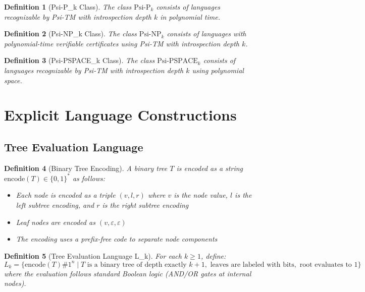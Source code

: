 \documentclass[11pt]{article}
\newtheorem{definition}{Definition}
\begin{document}
\begin{definition}[Psi-P_k Class]
The class $\text{Psi-P}_k$ consists of languages recognizable by Psi-TM with introspection depth $k$ in polynomial time.
\end{definition}

\begin{definition}[Psi-NP_k Class]
The class $\text{Psi-NP}_k$ consists of languages with polynomial-time verifiable certificates using Psi-TM with introspection depth $k$.
\end{definition}

\begin{definition}[Psi-PSPACE_k Class]
The class $\text{Psi-PSPACE}_k$ consists of languages recognizable by Psi-TM with introspection depth $k$ using polynomial space.
\end{definition}

\section{Explicit Language Constructions}

\subsection{Tree Evaluation Language}

\begin{definition}[Binary Tree Encoding]
A binary tree $T$ is encoded as a string $\text{encode}(T) \in \{0,1\}^*$ as follows:
\begin{itemize}
\item Each node is encoded as a triple $(v, l, r)$ where $v$ is the node value, $l$ is the left subtree encoding, and $r$ is the right subtree encoding
\item Leaf nodes are encoded as $(v, \varepsilon, \varepsilon)$
\item The encoding uses a prefix-free code to separate node components
\end{itemize}
\end{definition}

\begin{definition}[Tree Evaluation Language L_k]
For each $k \geq 1$, define:
$$L_k = \{\text{encode}(T)\#1^n \mid T \text{ is a binary tree of depth exactly } k+1, \text{ leaves are labeled with bits}, \text{ root evaluates to } 1\}$$
where the evaluation follows standard Boolean logic (AND/OR gates at internal nodes).
\end{definition}
\end{document}
